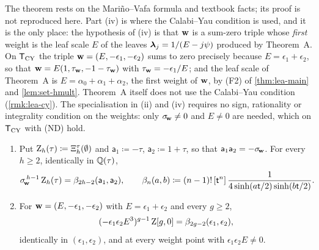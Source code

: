 The theorem rests on the Mari\~no--Vafa formula \cite[eq.~(1)--(3)]{LLZ03} and textbook facts; its proof is not reproduced here. Part (iv) is where the Calabi--Yau condition is used, and it is the only place: the hypothesis of (iv) is that $\mathbf{w}$ is a sum-zero triple whose \emph{first} weight is the leaf scale $E$ of the leaves $\boldsymbol{\lambda}_j=1/(E-j\psi)$ produced by Theorem~A. On $\mathsf{T}_{\mathrm{CY}}$ the triple $\mathbf{w}=(E,-\epsilon_1,-\epsilon_2)$ sums to zero precisely because $E=\epsilon_1+\epsilon_2$, so that $\mathbf{w}=E(1,\tau_{\mathbf{w}},-1-\tau_{\mathbf{w}})$ with $\tau_{\mathbf{w}}=-\epsilon_1/E$; and the leaf scale of Theorem~A is $E=\alpha_0+\alpha_1+\alpha_2$, the first weight of $\mathbf{w}$, by (F2) of \cref{thm:lea-main} and \cref{lem:set-hmult}. Theorem~A itself does not use the Calabi--Yau condition (\cref{rmk:lea-cy}). The specialisation in (ii) and (iv) requires no sign, rationality or integrality condition on the weights: only $\sigma_{\!\mathbf{w}}\neq 0$ and $E\neq 0$ are needed, which on $\mathsf{T}_{\mathrm{CY}}$ with (ND) hold.

\begin{thm}
\label{thm:reg-VI}
\begin{enumerate}
\item[(i)] \textup{\cite[Theorem~9.3]{LP2}} Put $\mathrm{Z}_h(\tau)\coloneqq\Xi^{\tau}_h(\emptyset)$ and $\mathsf{a}_1\coloneqq-\tau$, $\mathsf{a}_2\coloneqq 1+\tau$, so that $\mathsf{a}_1\mathsf{a}_2=-\sigma_{\!\mathbf{w}}$. For every $h\geq 2$, identically in $\mathbb{Q}(\tau)$,
\[
\sigma_{\!\mathbf{w}}^{\,h-1}\,\mathrm{Z}_h(\tau)=\beta_{2h-2}(\mathsf{a}_1,\mathsf{a}_2),\qquad
\beta_n(a,b)\coloneqq(n-1)!\,[\mathsf{t}^n]\,\frac{1}{4\sinh(a\mathsf{t}/2)\sinh(b\mathsf{t}/2)} .
\]
\item[(ii)] \textup{\cite[Theorem~9.1]{LP2}} For $\mathbf{w}=(E,-\epsilon_1,-\epsilon_2)$ with $E=\epsilon_1+\epsilon_2$ and every $g\geq 2$,
\begin{equation}
\label{eq:reg-VI}
(-\epsilon_1\epsilon_2E^3)^{g-1}\,\mathrm{Z}[g,0]=\beta_{2g-2}(\epsilon_1,\epsilon_2),
\end{equation}
identically in $(\epsilon_1,\epsilon_2)$, and at every weight point with $\epsilon_1\epsilon_2E\neq 0$.
\end{enumerate}
\end{thm}

